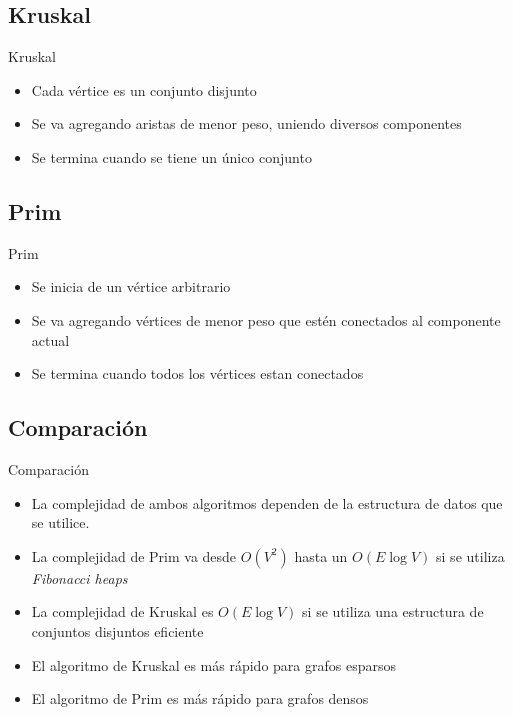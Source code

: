 \documentclass[handout]{beamer}
\begin{document}
\subsection{Kruskal}
\begin{frame}{Kruskal}
  \begin{itemize}
    \item Cada v\'ertice es un conjunto disjunto
      \pause
    \item Se va agregando aristas de menor peso, uniendo diversos componentes
      \pause
    \item Se termina cuando se tiene un \'unico conjunto 
  \end{itemize}
\end{frame}

\subsection{Prim}
\begin{frame}{Prim}
  \begin{itemize}
    \item Se inicia de un v\'ertice arbitrario
      \pause
    \item Se va agregando v\'ertices de menor peso que est\'en conectados al componente actual
      \pause
    \item Se termina cuando todos los v\'ertices estan conectados
  \end{itemize}
\end{frame}

\subsection{Comparaci\'on}
\begin{frame}{Comparaci\'on}
  \begin{itemize}
    \item La complejidad de ambos algoritmos dependen de la estructura de datos que se utilice.
      \pause
    \item La complejidad de Prim va desde $O(V^2)$ hasta un $O(E\log V)$ si se utiliza \textit{Fibonacci heaps}
      \pause
    \item La complejidad de Kruskal es $O(E \log V)$ si se utiliza una estructura de conjuntos disjuntos eficiente
      \pause
    \item El algoritmo de Kruskal es m\'as r\'apido para grafos esparsos
      \pause
    \item El algoritmo de Prim es m\'as r\'apido para grafos densos
  \end{itemize}
\end{frame}
\end{document}
